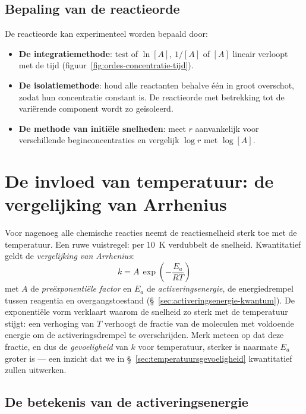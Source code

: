 \subsection{Bepaling van de reactieorde}
\label{sec:bepaling-orde}

De reactieorde kan experimenteel worden bepaald door:
\begin{itemize}
\item \textbf{De integratiemethode}: test of $\ln[A]$, $1/[A]$ of $[A]$ lineair verloopt met de tijd (figuur~\ref{fig:ordes-concentratie-tijd}).
\item \textbf{De isolatiemethode}: houd alle reactanten behalve \'e\'en in groot overschot, zodat hun concentratie constant is. De reactieorde met betrekking tot de vari\"erende component wordt zo ge\"isoleerd.
\item \textbf{De methode van initi\"ele snelheden}: meet $r$ aanvankelijk voor verschillende beginconcentraties en vergelijk $\log r$ met $\log[A]$.
\end{itemize}

\section{De invloed van temperatuur: de vergelijking van Arrhenius}
\label{sec:arrhenius}

Voor nagenoeg alle chemische reacties neemt de reactiesnelheid sterk toe met de temperatuur. Een ruwe vuistregel: per \SI{10}{\kelvin} verdubbelt de snelheid. Kwantitatief geldt de \emph{vergelijking van Arrhenius}:
\begin{equation}
\boxed{\;k = A\,\exp\!\left(-\frac{E_a}{RT}\right)\;}
\label{eq:arrhenius}
\end{equation}
met $A$ de \emph{pre\"exponenti\"ele factor} en $E_a$ de \emph{activeringsenergie}, de energiedrempel tussen reagentia en overgangstoestand (\S~\ref{sec:activeringsenergie-kwantum}). De exponenti\"ele vorm verklaart waarom de snelheid zo sterk met de temperatuur stijgt: een verhoging van $T$ verhoogt de fractie van de moleculen met voldoende energie om de activeringsdrempel te overschrijden. Merk meteen op dat deze fractie, en dus de \emph{gevoeligheid} van $k$ voor temperatuur, sterker is naarmate $E_a$ groter is --- een inzicht dat we in \S~\ref{sec:temperatuursgevoeligheid} kwantitatief zullen uitwerken.

\subsection{De betekenis van de activeringsenergie}

